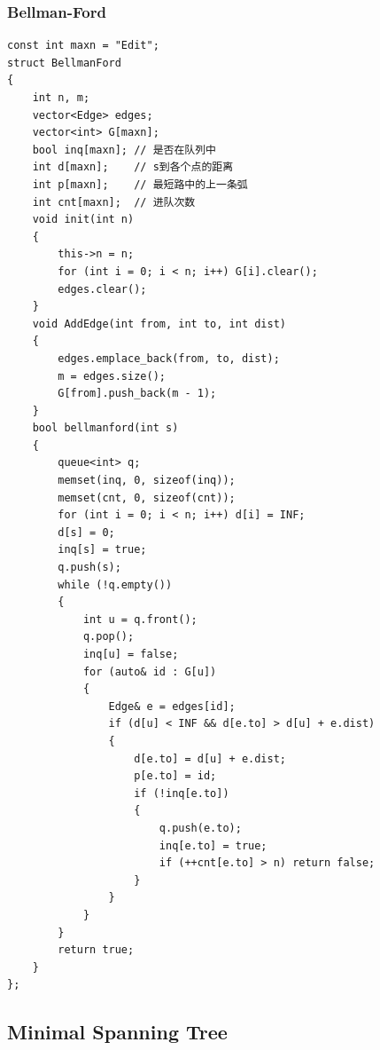 \documentclass[twoside]{article}
\begin{document}
\subsubsection{Bellman-Ford}
\begin{lstlisting}
const int maxn = "Edit";
struct BellmanFord
{
    int n, m;
    vector<Edge> edges;
    vector<int> G[maxn];
    bool inq[maxn]; // 是否在队列中
    int d[maxn];    // s到各个点的距离
    int p[maxn];    // 最短路中的上一条弧
    int cnt[maxn];  // 进队次数
    void init(int n)
    {
        this->n = n;
        for (int i = 0; i < n; i++) G[i].clear();
        edges.clear();
    }
    void AddEdge(int from, int to, int dist)
    {
        edges.emplace_back(from, to, dist);
        m = edges.size();
        G[from].push_back(m - 1);
    }
    bool bellmanford(int s)
    {
        queue<int> q;
        memset(inq, 0, sizeof(inq));
        memset(cnt, 0, sizeof(cnt));
        for (int i = 0; i < n; i++) d[i] = INF;
        d[s] = 0;
        inq[s] = true;
        q.push(s);
        while (!q.empty())
        {
            int u = q.front();
            q.pop();
            inq[u] = false;
            for (auto& id : G[u])
            {
                Edge& e = edges[id];
                if (d[u] < INF && d[e.to] > d[u] + e.dist)
                {
                    d[e.to] = d[u] + e.dist;
                    p[e.to] = id;
                    if (!inq[e.to])
                    {
                        q.push(e.to);
                        inq[e.to] = true;
                        if (++cnt[e.to] > n) return false;
                    }
                }
            }
        }
        return true;
    }
};
\end{lstlisting}
\subsection{Minimal Spanning Tree}
\end{document}
